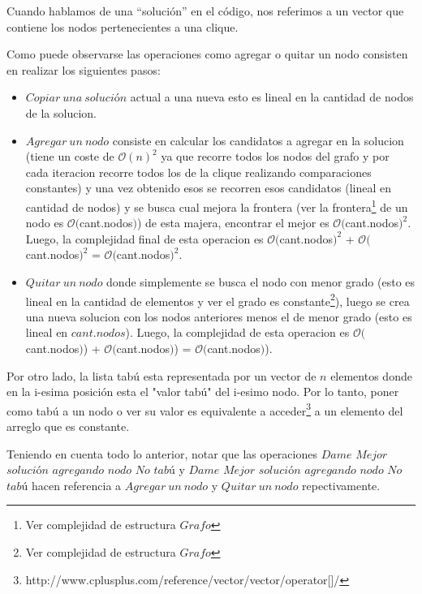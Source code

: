  Cuando hablamos de una ``solución'' en el código, nos referimos a un vector que contiene los nodos pertenecientes a una clique. \newline

 Como puede observarse las operaciones como agregar o quitar un nodo consisten en realizar los siguientes pasos: \newline
\begin{itemize}
 \item $Copiar\ una\ solución$ actual a una nueva esto es lineal en la cantidad de nodos de la solucion.
 \item $Agregar\ un\ nodo$ consiste en calcular los candidatos a agregar en la solucion (tiene un coste de $\mathcal{O}(n)^{2}$ ya que recorre todos los nodos del grafo y por cada iteracion recorre todos los de la clique realizando comparaciones constantes) y una vez obtenido esos se recorren esos candidatos (lineal en cantidad de nodos) y se busca cual mejora la frontera (ver la frontera\footnote{Ver complejidad de estructura $Grafo$} de un nodo es $\mathcal{O}($cant.nodos$)$) de esta majera, encontrar el mejor es $\mathcal{O}($cant.nodos$)^{2}$. Luego, la complejidad final de esta operacion es $\mathcal{O}($cant.nodos$)^{2}$ + $\mathcal{O}($cant.nodos$)^{2}$ = $\mathcal{O}($cant.nodos$)^{2}$.
 \item $Quitar\ un\ nodo$ donde simplemente se busca el nodo con menor grado (esto es lineal en la cantidad de elementos y ver el grado es constante\footnote{Ver complejidad de estructura $Grafo$}), luego se crea una nueva solucion con los nodos anteriores menos el de menor grado (esto es lineal en $cant.nodos$). Luego, la complejidad de esta operacion es $\mathcal{O}($cant.nodos$)$) + $\mathcal{O}($cant.nodos$)$) = $\mathcal{O}($cant.nodos$)$).
\end{itemize}

 Por otro lado, la lista tabú esta representada por un vector de $n$ elementos donde en la i-esima posición esta el "valor tabú" del i-esimo nodo. Por lo tanto, poner como tabú a un nodo o ver su valor es equivalente a acceder\footnote{http://www.cplusplus.com/reference/vector/vector/operator[]/} a un elemento del arreglo que es constante.\newline

 Teniendo en cuenta todo lo anterior, notar que las operaciones $Dame$ $Mejor$ $solución$ $agregando$ $nodo$ $No$ $tabú$ y $Dame$ $Mejor$ $solución$ $agregando$ $nodo$ $No$ $tabú$ hacen referencia a $Agregar\ un\ nodo$ y $Quitar\ un\ nodo$ repectivamente.\newline

